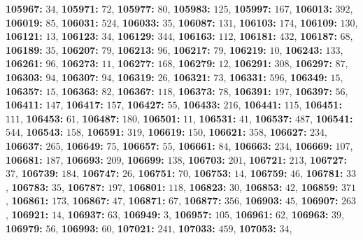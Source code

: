 \textsf{\bfseries 105967:} $34$, \textsf{\bfseries 105971:} $72$, \textsf{\bfseries 105977:} $80$, \textsf{\bfseries 105983:} $125$, \textsf{\bfseries 105997:} $167$, \textsf{\bfseries 106013:} $392$, \textsf{\bfseries 106019:} $85$, \textsf{\bfseries 106031:} $524$, \textsf{\bfseries 106033:} $35$, \textsf{\bfseries 106087:} $131$, \textsf{\bfseries 106103:} $174$, \textsf{\bfseries 106109:} $130$, \textsf{\bfseries 106121:} $13$, \textsf{\bfseries 106123:} $34$, \textsf{\bfseries 106129:} $344$, \textsf{\bfseries 106163:} $112$, \textsf{\bfseries 106181:} $432$, \textsf{\bfseries 106187:} $68$, \textsf{\bfseries 106189:} $35$, \textsf{\bfseries 106207:} $79$, \textsf{\bfseries 106213:} $96$, \textsf{\bfseries 106217:} $79$, \textsf{\bfseries 106219:} $10$, \textsf{\bfseries 106243:} $133$, \textsf{\bfseries 106261:} $96$, \textsf{\bfseries 106273:} $11$, \textsf{\bfseries 106277:} $168$, \textsf{\bfseries 106279:} $12$, \textsf{\bfseries 106291:} $308$, \textsf{\bfseries 106297:} $87$, \textsf{\bfseries 106303:} $94$, \textsf{\bfseries 106307:} $94$, \textsf{\bfseries 106319:} $26$, \textsf{\bfseries 106321:} $73$, \textsf{\bfseries 106331:} $596$, \textsf{\bfseries 106349:} $15$, \textsf{\bfseries 106357:} $15$, \textsf{\bfseries 106363:} $82$, \textsf{\bfseries 106367:} $118$, \textsf{\bfseries 106373:} $78$, \textsf{\bfseries 106391:} $197$, \textsf{\bfseries 106397:} $56$, \textsf{\bfseries 106411:} $147$, \textsf{\bfseries 106417:} $157$, \textsf{\bfseries 106427:} $55$, \textsf{\bfseries 106433:} $216$, \textsf{\bfseries 106441:} $115$, \textsf{\bfseries 106451:} $111$, \textsf{\bfseries 106453:} $61$, \textsf{\bfseries 106487:} $180$, \textsf{\bfseries 106501:} $11$, \textsf{\bfseries 106531:} $41$, \textsf{\bfseries 106537:} $487$, \textsf{\bfseries 106541:} $544$, \textsf{\bfseries 106543:} $158$, \textsf{\bfseries 106591:} $319$, \textsf{\bfseries 106619:} $150$, \textsf{\bfseries 106621:} $358$, \textsf{\bfseries 106627:} $234$, \textsf{\bfseries 106637:} $265$, \textsf{\bfseries 106649:} $75$, \textsf{\bfseries 106657:} $55$, \textsf{\bfseries 106661:} $84$, \textsf{\bfseries 106663:} $234$, \textsf{\bfseries 106669:} $107$, \textsf{\bfseries 106681:} $187$, \textsf{\bfseries 106693:} $209$, \textsf{\bfseries 106699:} $138$, \textsf{\bfseries 106703:} $201$, \textsf{\bfseries 106721:} $213$, \textsf{\bfseries 106727:} $37$, \textsf{\bfseries 106739:} $184$, \textsf{\bfseries 106747:} $26$, \textsf{\bfseries 106751:} $70$, \textsf{\bfseries 106753:} $14$, \textsf{\bfseries 106759:} $46$, \textsf{\bfseries 106781:} $33$, \textsf{\bfseries 106783:} $35$, \textsf{\bfseries 106787:} $197$, \textsf{\bfseries 106801:} $118$, \textsf{\bfseries 106823:} $30$, \textsf{\bfseries 106853:} $42$, \textsf{\bfseries 106859:} $371$, \textsf{\bfseries 106861:} $173$, \textsf{\bfseries 106867:} $47$, \textsf{\bfseries 106871:} $67$, \textsf{\bfseries 106877:} $356$, \textsf{\bfseries 106903:} $45$, \textsf{\bfseries 106907:} $263$, \textsf{\bfseries 106921:} $14$, \textsf{\bfseries 106937:} $63$, \textsf{\bfseries 106949:} $3$, \textsf{\bfseries 106957:} $105$, \textsf{\bfseries 106961:} $62$, \textsf{\bfseries 106963:} $39$, \textsf{\bfseries 106979:} $56$, \textsf{\bfseries 106993:} $60$, \textsf{\bfseries 107021:} $241$, \textsf{\bfseries 107033:} $459$, \textsf{\bfseries 107053:} $34$, 
